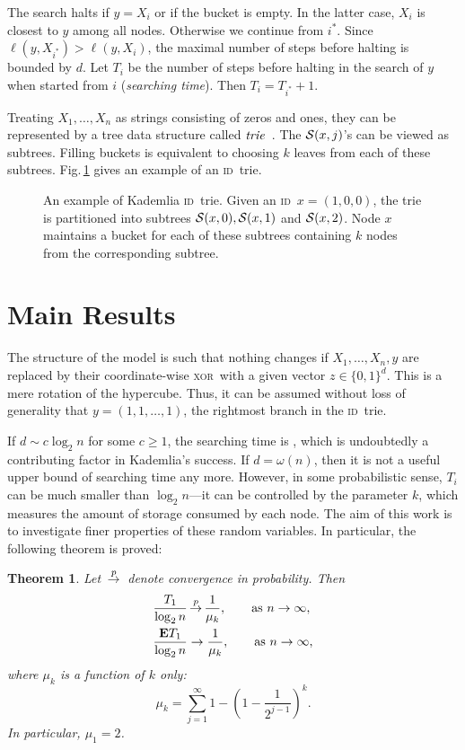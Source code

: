 \documentclass{article}
\newcommand{\idspace}{\{0,1\}^d}
\newcommand{\id}{{\scshape id}}
\newcommand{\xor}{{\scshape xor}}
\newcommand\cS{{\cal S}}
\newcommand{\e}{{\textbf E}}
\newcommand\inprobHIGH{\,{\buildrel p \over \rightarrow}\,}
\newcommand\inprob{{\inprobHIGH}}
\newtheorem{theorem}{Theorem}
\begin{document}
The search halts if $y = X_{i}$ or if the bucket is empty. In the latter case,
$X_i$ is closest to $y$ among all nodes. Otherwise we continue from $i^*$.
Since $\ell(y,X_{i^*}) > \ell(y,X_i)$, the maximal number of steps before
halting is bounded by $d$.  Let $T_i$ be the number of steps before halting in
the search of $y$ when started from $i$ (\emph{searching time}).  Then $T_i =
T_{i^*}+1$.

Treating $X_1,\ldots,X_n$ as strings consisting of zeros and ones, they can be
represented by a tree data structure called
$\emph{trie}$~\citep{Szpankowski2011}.  The $\cS(x,j)$'s can be viewed as
subtrees.  Filling buckets is equivalent to choosing  $k$ leaves from each
of these subtrees.  Fig.\,\ref{fig:partition} gives an example of an \id\ trie.

\begin{figure}
\caption[]{An example of Kademlia \id\ trie. Given an \id\ $x=(1,0,0)$, the
trie is partitioned into subtrees $\cS(x,0), \cS(x,1)$ and $\cS(x,2)$.  Node
$x$ maintains a bucket for each of these subtrees containing  $k$ nodes
from the corresponding subtree.}
\label{fig:partition}
\end{figure}

\section{Main Results}

The structure of the model is such that nothing changes if $X_1,\dots,X_n, y$ are
replaced by their coordinate-wise \xor\ with a given vector $z \in \idspace$.
This is a mere rotation of the hypercube.
Thus, it can be assumed without loss of generality that $y =
(1,1,\ldots,1)$, the rightmost branch in the \id\ trie.

If $d \sim c \log_2 n$ for some $c \ge 1$, the searching time is , which is undoubtedly a contributing factor in Kademlia's success.
If $d = \omega(n)$, then it is not a useful upper bound of searching time
any more. However, in some
probabilistic sense, $T_i$ can be much smaller than
$\log_2 n$---it can be controlled by the parameter $k$, which measures the
amount of storage consumed by each node. The aim of this work is to investigate
finer properties of these random variables. In particular, the following
theorem is proved:
\begin{theorem}
\label{thm:random:target}
Let $\inprob$
denote convergence in probability. Then
\begin{align*}
& \frac {T_{1}} {\log_2 n} \inprob \frac 1 {\mu_k}, \qquad \text{as } n \to
\infty, \\
& \frac {\e T_{1}} {\log_2 n} \to \frac 1 {\mu_k}, \qquad \text{as } n \to
\infty,
\end{align*}
where $\mu_k$ is a function of $k$ only:
$$
\mu_k = \sum_{j=1}^{\infty} 1 - \left( 1 - \frac 1 {2^{j-1}} \right)^k.
$$
In particular, $\mu_1 = 2$.
\end{theorem}
\end{document}
